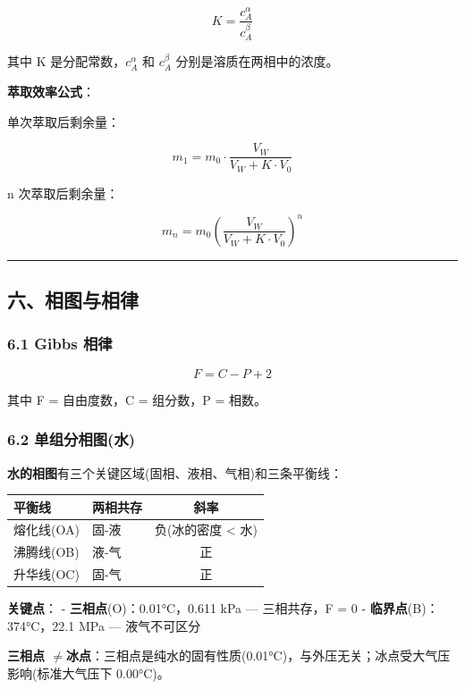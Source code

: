 \documentclass[a4paper,11pt]{ctexart}
\newcounter{none}
\newcommand{\箭}{\ensuremath{\rightarrow}}
\newcommand{\左箭}{\ensuremath{\leftarrow}}
\newcommand{\上箭}{\ensuremath{\uparrow}}
\newcommand{\下箭}{\ensuremath{\downarrow}}
\newcommand{\衡}{\ensuremath{\rightleftharpoons}}
\newcommand{\双箭}{\ensuremath{\leftrightarrow}}
\newcommand{\约等于}{\ensuremath{\approx}}
\newcommand{\小于等于}{\ensuremath{\leq}}
\newcommand{\大于等于}{\ensuremath{\geq}}
\newcommand{\不等于}{\ensuremath{\neq}}
\newcommand{\西格马}{\ensuremath{\sigma}}
\newcommand{\派}{\ensuremath{\pi}}
\begin{document}
\[
\boxed{K = \frac{c_A^\alpha}{c_A^\beta}}
\]

其中 K 是分配常数，\(c_A^\alpha\) 和 \(c_A^\beta\) 分别是溶质在两相中的浓度。

\textbf{萃取效率公式}：

单次萃取后剩余量：

\[
m_1 = m_0 \cdot \frac{V_W}{V_W + K \cdot V_0}
\]

n 次萃取后剩余量：

\[
m_n = m_0 \left(\frac{V_W}{V_W + K \cdot V_0}\right)^n
\]

\begin{center}\rule{0.5\linewidth}{0.5pt}\end{center}

\subsection{六、相图与相律}\label{ux516dux76f8ux56feux4e0eux76f8ux5f8b}

\subsubsection{6.1 Gibbs 相律}\label{gibbs-ux76f8ux5f8b}

\[
\boxed{F = C - P + 2}
\]

其中 F = 自由度数，C = 组分数，P = 相数。

\subsubsection{6.2 单组分相图(水)}\label{ux5355ux7ec4ux5206ux76f8ux56feux6c34}

\textbf{水的相图}有三个关键区域(固相、液相、气相)和三条平衡线：

{\def\LTcaptype{none} %
\begin{longtable}[]{@{}llc@{}}
\toprule\noalign{}
平衡线 & 两相共存 & 斜率 \\
\midrule\noalign{}
\endhead
\bottomrule\noalign{}
\endlastfoot
熔化线(OA) & 固-液 & 负(冰的密度 \textless{} 水) \\
沸腾线(OB) & 液-气 & 正 \\
升华线(OC) & 固-气 & 正 \\
\end{longtable}
}

\textbf{关键点}：
- \textbf{三相点}(O)：0.01°C，0.611 kPa --- 三相共存，F = 0
- \textbf{临界点}(B)：374°C，22.1 MPa --- 液气不可区分

\textbf{三相点 \不等于 冰点}：三相点是纯水的固有性质(0.01°C)，与外压无关；冰点受大气压影响(标准大气压下 0.00°C)。
\end{document}
